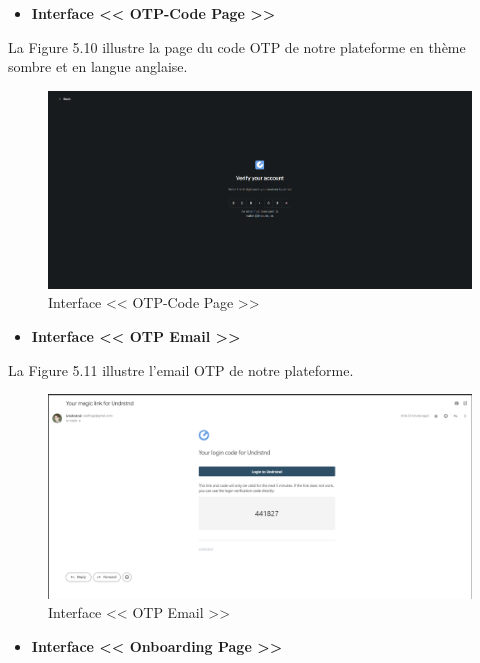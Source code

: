 \begin{itemize}
    \item \textbf{Interface << OTP-Code Page >>}
\end{itemize}
La Figure 5.10 illustre la page du code OTP de notre plateforme en thème sombre et en langue anglaise.
\begin{figure}[H]
    \centering
    \includegraphics[width=1.1\textwidth,height=0.5\textwidth]{images/chp5/fig10.png}
    \caption{Interface << OTP-Code Page >>}
    \label{Interface << OTP-Code Page >>}    
\end{figure}
\begin{itemize}
    \item \textbf{Interface << OTP Email >>}
\end{itemize}
La Figure 5.11 illustre l'email OTP de notre plateforme.
\begin{figure}[H]
    \centering
    \includegraphics[width=1.1\textwidth,height=0.5\textwidth]{images/chp5/fig11.png}
    \caption{Interface << OTP Email >>}
    \label{Interface << OTP Email >>}    
\end{figure} 
\begin{itemize}
    \item \textbf{Interface << Onboarding Page >>}
\end{itemize}
